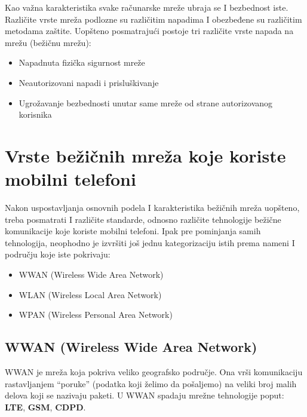 \documentclass[a4paper]{article}
\begin{document}
{Kao važna karakteristika svake računarske mreže ubraja se I bezbednost iste. Različite vrste mreža podlozne su različitim napadima I obezbeđene su različitim metodama zaštite.
Uopšteno posmatrajući postoje tri različite vrste napada na mrežu (bežičnu mrežu):

\begin{itemize}
    \item Napadnuta fizička sigurnost mreže
    \item Neautorizovani napadi i prisluškivanje
    \item Ugrožavanje bezbednosti unutar same mreže od strane autorizovanog korisnika
\end{itemize}


\section{Vrste bežičnih mreža koje koriste mobilni telefoni}
\label{vrste_mreza_na_telefonu}

Nakon uspostavljanja osnovnih podela I karakteristika bežičnih mreža uopšteno, treba posmatrati I različite standarde, odnosno različite tehnologije bežične komunikacije koje koriste mobilni telefoni. Ipak pre pominjanja samih tehnologija, neophodno je izvršiti još jednu kategorizaciju istih prema nameni I području koje iste pokrivaju:

\begin{itemize}
    \item WWAN (Wireless Wide Area Network)
    \item WLAN (Wireless Local Area Network)
    \item WPAN (Wireless Personal Area Network)
\end{itemize}
    \subsection{WWAN (Wireless Wide Area Network)}
WWAN je mreža koja pokriva veliko geografsko područje. Ona vrši komunikaciju rastavljanjem “poruke” (podatka koji želimo da pošaljemo) na veliki broj malih delova koji se nazivaju paketi. U WWAN spadaju mrežne tehnologije poput: \textbf{LTE}, \textbf{GSM}, \textbf{CDPD}. 
}
\end{document}

